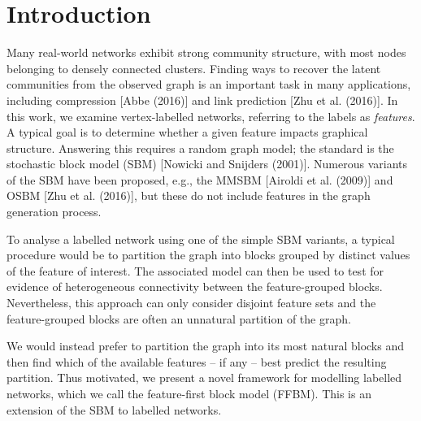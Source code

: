 \section{Introduction}

Many real-world networks exhibit strong community structure, with most nodes belonging to densely connected clusters. 
Finding ways to recover the latent communities from the observed graph is an important
task in many applications,
including
compression [Abbe (2016)] and link prediction 
[Zhu et al. (2016)].
In this work, we examine vertex-labelled networks, 
referring to the labels as {\em features}. A typical goal is to determine whether a given feature impacts graphical structure. Answering this requires a random graph model;
the standard is the stochastic block model (SBM) [Nowicki and Snijders (2001)]. Numerous variants of the SBM  have been proposed, e.g., the MMSBM [Airoldi et al. (2009)] and OSBM [Zhu et al. (2016)], but these do not include features in the graph generation process.

To analyse a labelled network using one of the simple SBM variants, a typical procedure would be to partition the graph into blocks grouped by distinct values of the feature of interest. The associated model can then be used to test for evidence of heterogeneous connectivity between the feature-grouped blocks. Nevertheless, this approach can only consider disjoint feature sets and the feature-grouped blocks are often an unnatural partition of the graph.

We would instead prefer to partition the graph into its most natural blocks and then find which of the available features -- if any -- best predict the resulting partition. Thus motivated, we present a novel framework for modelling labelled networks, which we call the feature-first block model (FFBM). This is an extension of the SBM to labelled networks.
